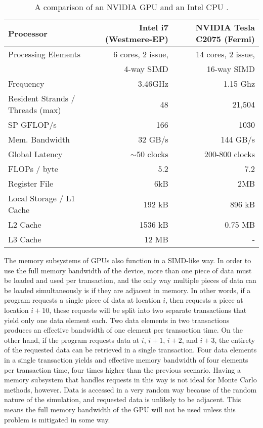 \begin{table}[h]
\centering
\caption[A comparison of an NVIDIA GPU and an Intel CPU]{A comparison of an NVIDIA GPU and an Intel CPU \cite{cent, cpu_latency,opteronperformance}.}
\label{gpu_cpu_comp}
\begin{tabular}{| l | r | r |}
\hline
Processor & Intel i7 (Westmere-EP) & NVIDIA Tesla C2075 (Fermi) \\
\hline
\hline
Processing Elements & 6 cores, 2 issue, & 14 cores, 2 issue, \\
& 4-way SIMD &  16-way SIMD  \\
\hline
Frequency & 3.46GHz &  1.15 Ghz \\
\hline
Resident Strands / Threads (max) & 48 & 21,504 \\
\hline
SP GFLOP/s & 166 & 1030 \\
\hline
Mem. Bandwidth &  32 GB/s & 144 GB/s \\
\hline
Global Latency & $\sim$50 clocks & 200-800 clocks  \\
\hline
FLOPs / byte & 5.2  & 7.2 \\
\hline
Register File & 6kB & 2MB \\
\hline
Local Storage / L1 Cache & 192 kB & 896 kB \\
\hline
L2 Cache & 1536 kB & 0.75 MB \\
\hline
L3 Cache & 12 MB & - \\
\hline
\end{tabular}
\end{table}

The memory subsystems of GPUs also function in a SIMD-like way.  In order to use the full memory bandwidth of the device, more than one piece of data must be loaded and used per transaction, and the only way multiple pieces of data can be loaded simultaneously is if they are adjacent in memory.  In other words, if a program requests a single piece of data at location $i$, then requests a piece at location $i+10$, these requests will be split into two separate transactions that yield only one data element each.  Two data elements in two transactions produces an effective bandwidth of one element per transaction time.   On the other hand, if the program requests data at $i$, $i+1$, $i+2$, and $i+3$, the entirety of the requested data can be retrieved in a single transaction.  Four data elements in a single transaction yields and effective memory bandwidth of four elements per transaction time, four times higher than the previous scenario.  Having a memory subsystem that handles requests in this way is not ideal for Monte Carlo methods, however.  Data is accessed in a very random way because of the random nature of the simulation, and requested data is unlikely to be adjacent.  This means the full memory bandwidth of the GPU will not be used unless this problem is mitigated in some way.

